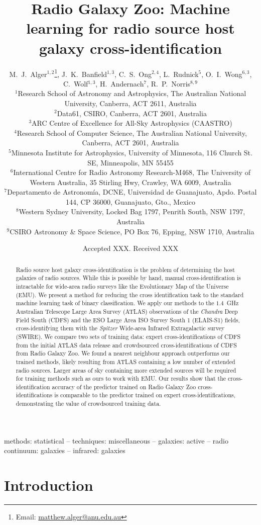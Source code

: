 \documentclass[fleqn,usenatbib,usedcolumn]{mnras}
\title[Machine learning for radio cross-identification]{Radio Galaxy Zoo: Machine learning for radio source host galaxy cross-identification}
\author[Alger et al.]{M.~J.~Alger$^{1, 2}$\thanks{Email: \href{mailto:matthew.alger@anu.edu.au}{matthew.alger@anu.edu.au}},
  J.~K.~Banfield$^{1, 3}$,
  C.~S.~Ong$^{2, 4}$,
  L.~Rudnick$^{5}$,
  O.~I.~Wong$^{6, 3}$,
  C.~Wolf$^{1, 3}$,
  \newauthor
  H.~Andernach$^{7}$,
  R.~P.~Norris$^{8, 9}$
\\
$^{1}$Research School of Astronomy and Astrophysics, The Australian National University, Canberra, ACT 2611, Australia\\
$^{2}$Data61, CSIRO, Canberra, ACT 2601, Australia\\
$^{3}$ARC Centre of Excellence for All-Sky Astrophysics (CAASTRO)\\
$^{4}$Research School of Computer Science, The Australian National University, Canberra, ACT 2601, Australia\\
$^{5}$Minnesota Institute for Astrophysics, University of Minnesota, 116 Church St. SE, Minneapolis, MN 55455\\
$^{6}$International Centre for Radio Astronomy Research-M468, The University of Western Australia, 35 Stirling Hwy, Crawley, WA 6009, Australia\\
$^{7}$Departamento de Astronom\'ia, DCNE, Universidad de Guanajuato, Apdo. Postal 144, CP 36000, Guanajuato, Gto., Mexico\\
$^{8}$Western Sydney University, Locked Bag 1797, Penrith South, NSW 1797, Australia\\
$^{9}$CSIRO Astronomy \& Space Science, PO Box 76, Epping, NSW 1710, Australia
}
\date{Accepted XXX. Received XXX}
\begin{document}
\label{firstpage}
\pagerange{\pageref{firstpage}--\pageref{lastpage}}
\maketitle

\begin{abstract}
  Radio source host galaxy cross-identification is the problem of determining the host galaxies of radio sources. While this is possible by hand, manual cross-identification is intractable for wide-area radio surveys like the Evolutionary Map of the Universe (EMU). We present a method for reducing the cross identification task to the standard machine learning task of binary classification. We apply our methods to the $1.4$~GHz Australian Telescope Large Area Survey (ATLAS) observations of the \emph{Chandra} Deep Field South (CDFS) and the ESO Large Area ISO Survey South 1 (ELAIS-S1) fields, cross-identifying them with the \emph{Spitzer} Wide-area Infrared Extragalactic survey (SWIRE). We compare two sets of training data: expert cross-identifications of CDFS from the initial ATLAS data release and crowdsourced cross-identifications of CDFS from Radio Galaxy Zoo. We found a nearest neighbour approach outperforms our trained methods, likely resulting from ATLAS containing a low number of extended radio sources. Larger areas of sky containing more extended sources will be required for training methods such as ours to work with EMU. Our results show that the cross-identification accuracy of the predictor trained on Radio Galaxy Zoo cross-identifications is comparable to the predictor trained on expert cross-identifications, demonstrating the value of crowdsourced training data.
\end{abstract}

\begin{keywords}
methods: statistical -- techniques: miscellaneous -- galaxies: active -- radio continuum: galaxies -- infrared: galaxies\\
\end{keywords}


\section{Introduction}\label{introduction}
\end{document}
